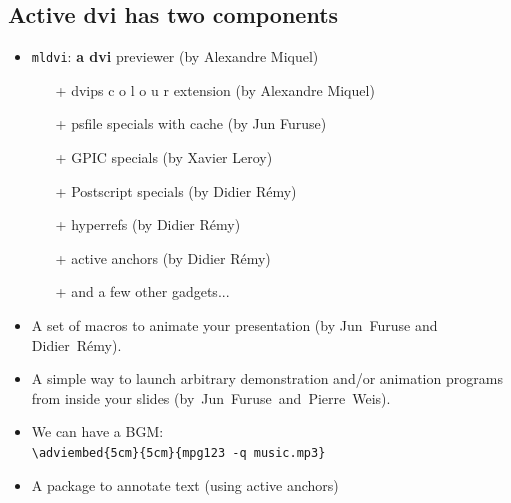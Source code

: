 \documentclass[12pt]{article}
\begin{document}
\newpage

\subsection* {Active dvi has two components}

\begin{itemize}
\item {\tt mldvi}: {\bf a dvi} previewer (by Alexandre Miquel)
\begin {itemize}
\item[+] dvips
  \textcolor{c1}{c}%
  \textcolor{c2}{o}%
  \textcolor{c3}{l}%
  \textcolor{c4}{o}%
  \textcolor{c5}{u}%
  \textcolor{c6}{r}
  extension (by Alexandre Miquel)
\item[+] psfile specials with cache (by Jun Furuse)
\item[+] GPIC specials (by Xavier Leroy)
\item[+] Postscript specials (by Didier R{\'{e}}my)
\item[+] hyperrefs (by Didier R{\'{e}}my)
\item[+] active anchors (by Didier R{\'{e}}my)
\item[+] and a few other gadgets...
\end {itemize}
\end{itemize}

\begin{itemize}
\item 
A set of macros to animate your presentation 
(by Jun~Furuse and Didier~R{\'{e}}my).
 
\item 
A simple way to launch arbitrary demonstration and/or animation
programs from inside your slides
\hbox {(by Jun Furuse and Pierre Weis)}.
 \item We can have a BGM:\\
   \verb|\adviembed{5cm}{5cm}{mpg123 -q music.mp3}|

\item 
A package to annotate text (using active anchors)
\end{itemize}

\newpage

\def \flash #1{\let \do\leflash \do #1\relax}
\def \leflash #1{\ifx #1\relax \def \do{}\else \def \do {#1\adviwait[0.05]\leflash}\fi \do}

\def\goon{\hbox{{\Large $\Rightarrow$}~Type~space~to~go~on}}
\end{document}
